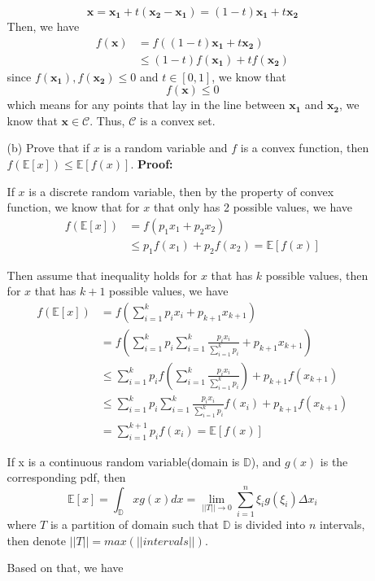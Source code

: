 \documentclass{article}
\newcommand{\E}{\mathbb{E}}
\renewcommand{\b}[1]{\bm{#1}}
\begin{document}
\begin{enumerate}
\begin{enumerate}
        \[\b{x}=\b{x_1}+t(\b{x_2}-\b{x_1})=(1-t)\b{x_1}+t\b{x_2}\]
        Then, we have
        \begin{align*}
            f(\b{x})&=f((1-t)\b{x_1}+t\b{x_2})\\
            &\leq (1-t)f(\b{x_1})+tf(\b{x_2})
        \end{align*}
        since $f(\b{x_1}),f(\b{x_2})\leq 0$ and $t\in[0,1]$, we know that
        \[f(\b{x})\leq 0\]
        which means for any points that lay in the line between $\b{x_1}$ and $\b{x_2}$, we know that $\b{x}\in \mathcal{C}$. Thus, $\mathcal{C}$ is a convex set.
        \item[(b)] Prove that if $x$ is a random variable and $f$ is a convex function, then $f(\E[x])\leq \E[f(x)]$.\newline
        {\bf Proof:}\par
        If $x$ is a discrete random variable, then by the property of convex function, we know that for $x$ that only has 2 possible values, we have
        \begin{align*}
            f(\E[x]) &= f(p_1x_1+p_2x_2)\\
            &\leq p_1f(x_1)+p_2f(x_2)=\E[f(x)]
        \end{align*}
        \par Then assume that inequality holds for $x$ that has $k$ possible values, then for $x$ that has $k+1$ possible values, we have
        \begin{align*}
            f(\E[x]) &= f(\sum_{i=1}^k p_ix_i + p_{k+1}x_{k+1})\\
            &= f\left(\sum_{i=1}^k p_i\sum_{i=1}^k \frac{p_i x_i}{\sum_{i=1}^k p_i}+p_{k+1}x_{k+1}\right)\\
            &\leq \sum_{i=1}^k p_i f\left(\sum_{i=1}^k \frac{p_i x_i}{\sum_{i=1}^k p_i}\right)+p_{k+1}f(x_{k+1})\\
            &\leq \sum_{i=1}^k p_i\sum_{i=1}^k \frac{p_i x_i}{\sum_{i=1}^k p_i} f(x_i) +p_{k+1}f(x_{k+1})\\
            &= \sum_{i=1}^{k+1}p_if(x_i)=\E[f(x)]
        \end{align*}
        \par If x is a continuous random variable(domain is $\mathbb{D}$), and $g(x)$ is the corresponding pdf, then 
        \[\E[x]=\int_{\mathbb{D}}xg(x)dx=\lim_{||T||\to 0}\sum_{i=1}^{n}\xi_i g(\xi_i)\Delta x_i \]
        where $T$ is a partition of domain such that $\mathbb{D}$ is divided into $n$ intervals, then denote $||T||=max(||intervals||)$.
        \par Based on that, we have

\end{enumerate}
\end{enumerate}
\end{document}
